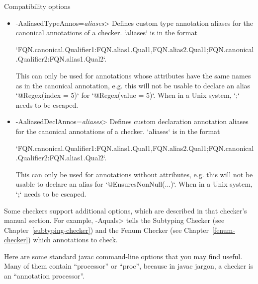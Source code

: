 Compatibility options
\begin{itemize}

\item \<-AaliasedTypeAnnos=\emph{aliases}>
  Defines custom type annotation aliases for the canonical annotations of a checker.
  `aliases` is in the format

`FQN.canonical.Qualifier1:FQN.alias1.Qual1,FQN.alias2.Qual1;FQN.canonical.Qualifier2:FQN.alias1.Qual2`.

This can only be used for annotations whose attributes have the same names as in the canonical
annotation, e.g. this will not be usable to declare an alias `@Regex(index = 5)` for `@Regex(value = 5)`.
When in a Unix system, `;` needs to be escaped.

\item \<-AaliasedDeclAnnos=\emph{aliases}>
  Defines custom declaration annotation aliases for the canonical annotations of a checker.
  `aliases` is in the format

`FQN.canonical.Qualifier1:FQN.alias1.Qual1,FQN.alias2.Qual1;FQN.canonical.Qualifier2:FQN.alias1.Qual2`.

This can only be used for annotations without attributes, e.g. this will not be usable to declare an alias for `@EnsuresNonNull(...)`.
When in a Unix system, `;` needs to be escaped.

\end{itemize}

\noindent
Some checkers support additional options, which are described in that
checker's manual section.
For example, \<-Aquals> tells
the Subtyping Checker (see Chapter~\ref{subtyping-checker}) and the Fenum Checker
(see Chapter~\ref{fenum-checker}) which annotations to check.


Here are some standard javac command-line options that you may find useful.
Many of them contain ``processor'' or ``proc'', because in javac jargon, a
checker is an ``annotation processor''.

